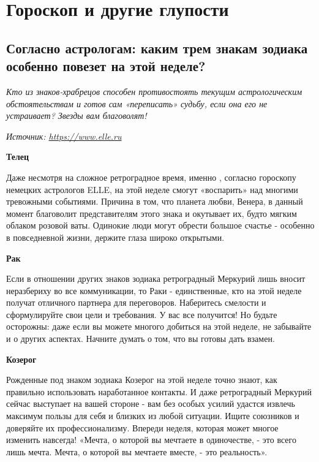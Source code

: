 \chapter{Гороскоп и другие глупости}

\section[Каким знакам зодиака повезет]{Согласно астрологам: каким трем знакам зодиака особенно повезет на этой неделе?}

\textit{Кто из знаков-храбрецов способен противостоять текущим астрологическим обстоятельствам и готов сам «переписать» судьбу, если она его не устраивает? Звезды вам благоволят!}

\textit{Источник: \url{https://www.elle.ru}}

\textbf{Телец}

Даже несмотря на сложное ретроградное время, именно , согласно гороскопу немецких астрологов ELLE, на этой неделе смогут «воспарить» над многими тревожными событиями. Причина в том, что планета любви, Венера, в данный момент благоволит представителям этого знака и окутывает их, будто мягким облаком розовой ваты. Одинокие люди могут обрести большое счастье - особенно в повседневной жизни, держите глаза широко открытыми.

\textbf{Рак}

Если в отношении других знаков зодиака ретроградный Меркурий лишь вносит неразбериху во все коммуникации, то Раки - единственные, кто на этой неделе получат отличного партнера для переговоров. Наберитесь смелости и сформулируйте свои цели и требования. У вас все получится! Но будьте осторожны: даже если вы можете многого добиться на этой неделе, не забывайте и о других аспектах. Начните думать о том, что вы готовы дать взамен.

\textbf{Козерог}

Рожденные под знаком зодиака Козерог на этой неделе точно знают, как правильно использовать наработанное контакты. И даже ретроградный Меркурий сейчас выступает на вашей стороне - вам без особых усилий удастся извлечь максимум пользы для себя и близких из любой ситуации. Ищите союзников и доверяйте их профессионализму. Впереди неделя, которая может многое изменить навсегда! «Мечта, о которой вы мечтаете в одиночестве, - это всего лишь мечта. Мечта, о которой вы мечтаете вместе, - это реальность».



